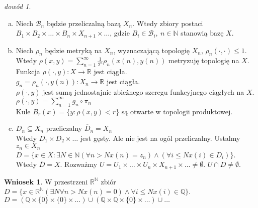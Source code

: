 \documentclass[twoside,10pt]{article}
\theoremstyle{definition}
\theoremstyle{definition}
\theoremstyle{definition}
\theoremstyle{definition}
\theoremstyle{remark}
\newtheorem*{dd}{dowód}
\theoremstyle{definition}
\theoremstyle{definition}
\newtheorem*{wn}{Wniosek}
\theoremstyle{definition}
\theoremstyle{definition}
\theoremstyle{definition}
\theoremstyle{definition}
\begin{document}
\begin{dd} \hfill 
    \begin{enumerate}[(a)] 
        \item Niech $\mathcal B_n$ będzie przeliczalną bazą $X_n$. Wtedy zbiory postaci 
            $B_1 \times B_2 \times \ldots \times B_n \times X_{n+1} \times \ldots$, gdzie 
            $B_i \in \mathcal B_i,\ n \in \mathbb N$ stanowią bazę $X$. 
        \item Niech $\rho_n$ będzie metryką na $X_n$, wyznaczającą topologię $X_n$, 
            $\rho_n(\cdot,\cdot) \le 1$. \\
            Wtedy $\rho (x,y) = \sum\limits_{n=1}^\infty
            \frac{1}{2^n} \rho_n (x(n),y(n))$ metryzuję topologię na $X$. \\ 
            Funkcja $\rho(\cdot,y): X \to \mathbb R$ jest ciągła. \\ 
            $g_n=\rho_n (\cdot,y(n)): X_n \to \mathbb R$ jest ciągła.  \\ 
            $\rho(\cdot,y)$ jest sumą jednostajnie zbieżnego szeregu funkcyjnego ciągłych
            na $X$. $\rho(\cdot,y) = \sum\limits_{n=1}^\infty g_n \circ \pi_n$ \\ 
            Kule $B_r (x) = \{y: \rho (x,y) < r \}$ są otwarte w topologii produktowej.
        \item $D_n \subseteq X_n$ przeliczalny $\overline D_n = X_n$ \\ 
            Wtedy $D_1 \times D_2 \times \ldots $ jest gęsty. Ale nie jest na ogól przeliczalny. 
            Ustalmy $z_n \in X_n$ \\ 
            $D = \{ x \in X: \exists N \in \mathbb N (\forall n > N x(n) = z_n) \land 
            (\forall i \le N x(i) \in D_i) \}$. \\ 
            Wtedy $\overline D = X$. Rozważmy $U = U_1 \times \ldots \times U_n \times X_{n+1} \times 
            \ldots  \neq \emptyset$. $U \cap D \neq \emptyset$.
    \end{enumerate} 
\end{dd}
\begin{wn} 
    W przestrzeni $\mathbb R ^ \mathbb N$ zbiór  $D = \{x \in \mathbb R ^ \mathbb N 
    (\exists N \forall n > N x(n) = 0) \land \forall i \le N x(i) \in \mathbb Q \}$. \\ 
    $D = ( \mathbb Q \times \{0\} \times \{0\} \times \ldots) \cup 
        (\mathbb Q \times \mathbb Q \times \{0\} \times \ldots) \cup \ldots$
\end{wn} 
\end{document}
